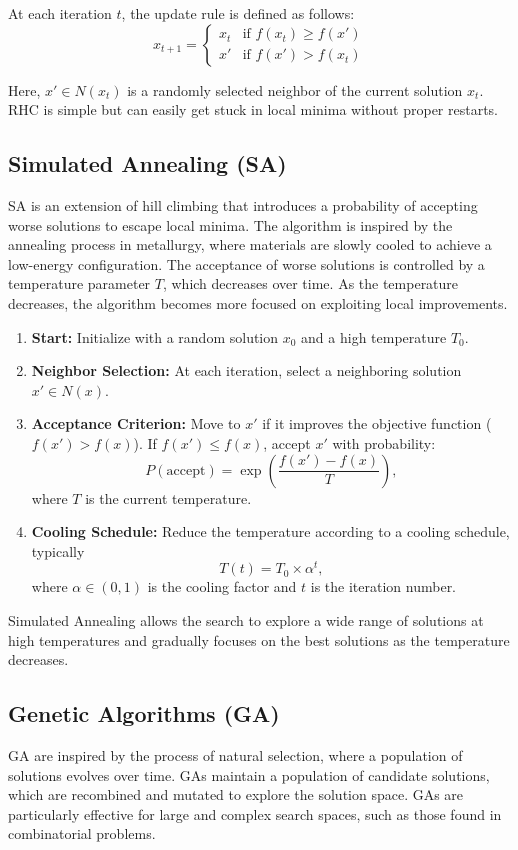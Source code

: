 At each iteration $t$, the update rule is defined as follows:
\[
x_{t+1} = 
\begin{cases} 
x_t & \text{if } f(x_t) \geq f(x') \\ 
x' & \text{if } f(x') > f(x_t) 
\end{cases}
\]

Here, $x' \in N(x_t)$ is a randomly selected neighbor of the current solution $x_t$. RHC is simple but can easily get stuck in local minima without proper restarts.

\subsection{Simulated Annealing (SA)}
SA is an extension of hill climbing that introduces a probability of accepting worse solutions to escape local minima. The algorithm is inspired by the annealing process in metallurgy, where materials are slowly cooled to achieve a low-energy configuration. The acceptance of worse solutions is controlled by a temperature parameter $T$, which decreases over time. As the temperature decreases, the algorithm becomes more focused on exploiting local improvements.

\begin{enumerate}
    \item \textbf{Start:} Initialize with a random solution $x_0$ and a high temperature $T_0$.
    \item \textbf{Neighbor Selection:} At each iteration, select a neighboring solution $x' \in N(x)$.
    \item \textbf{Acceptance Criterion:} Move to $x'$ if it improves the objective function ($f(x') > f(x)$). If $f(x') \leq f(x)$, accept $x'$ with probability:
    \[
    P(\text{accept}) = \exp\left(\frac{f(x') - f(x)}{T}\right),
    \]
    where $T$ is the current temperature.
    \item \textbf{Cooling Schedule:} Reduce the temperature according to a cooling schedule, typically 
    \[
    T(t) = T_0 \times \alpha^t,
    \]
    where $\alpha \in (0, 1)$ is the cooling factor and $t$ is the iteration number.
\end{enumerate}

Simulated Annealing allows the search to explore a wide range of solutions at high temperatures and gradually focuses on the best solutions as the temperature decreases.

\subsection{Genetic Algorithms (GA)}
GA are inspired by the process of natural selection, where a population of solutions evolves over time. GAs maintain a population of candidate solutions, which are recombined and mutated to explore the solution space. GAs are particularly effective for large and complex search spaces, such as those found in combinatorial problems.

